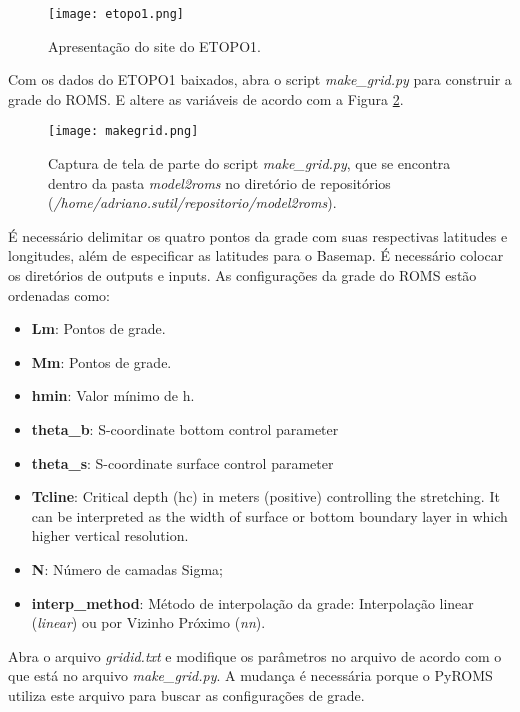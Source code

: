 \begin{figure}[H]
    \centering
    \captionsetup{justification=centering}
    \texttt{[image: etopo1.png]}
    \caption{Apresentação do site do ETOPO1.}
    \label{etopo1}
\end{figure}
\bigskip

\noindent Com os dados do ETOPO1 baixados, abra o script \textit{make\_grid.py} para construir a grade do ROMS. E altere as variáveis de acordo com a Figura \textcolor{bleu_cite}{\ref{fazgrade}}.
\bigskip

\begin{figure}[H]
    \centering
    \texttt{[image: makegrid.png]}
    \caption{Captura de tela de parte do script \textit{make\_grid.py}, que se encontra dentro da pasta \textit{model2roms} no diretório de repositórios (\textit{/home/adriano.sutil/repositorio/model2roms}).}
    \label{fazgrade}
\end{figure}
\bigskip

\noindent É necessário delimitar os quatro pontos da grade com suas respectivas latitudes e longitudes, além de especificar as latitudes para o Basemap. É necessário colocar os diretórios de outputs e inputs. As configurações da grade do ROMS estão ordenadas como:
\bigskip

\begin{itemize}
\item \textbf{Lm}: Pontos de grade.
\item \textbf{Mm}: Pontos de grade.
\item \textbf{hmin}: Valor mínimo de h.
\item \textbf{theta\_b}: S-coordinate bottom  control parameter
\item \textbf{theta\_s}: S-coordinate surface control parameter
\item \textbf{Tcline}: Critical depth (hc) in meters (positive) controlling the stretching. It can be interpreted as the width of surface or bottom boundary layer in which higher vertical resolution.
\item \textbf{N}: Número de camadas Sigma;
\item \textbf{interp\_method}: Método de interpolação da grade: Interpolação linear (\textit{linear}) ou por Vizinho Próximo (\textit{nn}).
\end{itemize}
\bigskip

\noindent Abra o arquivo \textit{gridid.txt} e modifique os parâmetros no arquivo de acordo com o que está no arquivo \textit{make\_grid.py}. A mudança é necessária porque o PyROMS utiliza este arquivo para buscar as configurações de grade.
\bigskip

